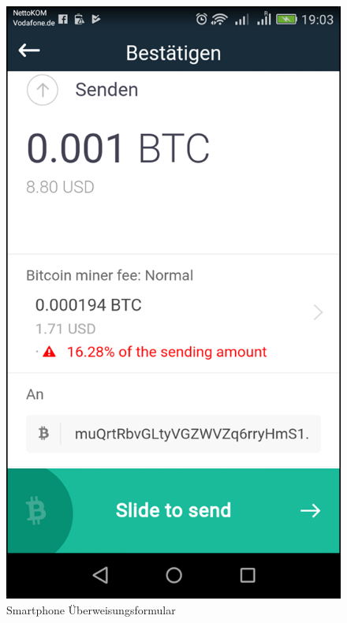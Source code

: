 \vspace{1cm}
\begin{minipage}{0.48\textwidth}
\begin{figure}[H]
\centering
\includegraphics[width=1\linewidth]{Figures/btc_gui/handy_send}
\decoRule
\caption{Smartphone Überweisungsformular}
\label{fig:handy_send}
\end{figure}
\end{minipage}
